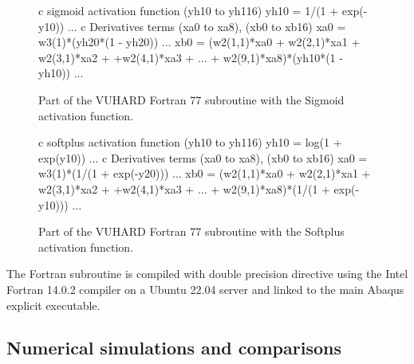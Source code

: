 \documentclass[algorithms,article,submit,pdftex,oneauthors]{Definitions/mdpi}
\begin{document}
\begin{figure}[h]
\begin{FortranListing}
c sigmoid activation function (yh10 to yh116)
      yh10 = 1/(1 + exp(-y10))
      ...
c Derivatives terms (xa0 to xa8), (xb0 to xb16)
      xa0 = w3(1)*(yh20*(1 - yh20))
      ...
      xb0 = (w2(1,1)*xa0 + w2(2,1)*xa1 + w2(3,1)*xa2
     + +w2(4,1)*xa3 + ... + w2(9,1)*xa8)*(yh10*(1 - yh10))
      ...
\end{FortranListing}
\caption{Part of the VUHARD Fortran 77 subroutine with the Sigmoid activation function.\label{fig:FortranSigmoid}}
\end{figure}
\begin{figure}[h]
\begin{FortranListing}
c softplus activation function (yh10 to yh116)
      yh10 = log(1 + exp(y10))
      ...
c Derivatives terms (xa0 to xa8), (xb0 to xb16)
      xa0 = w3(1)*(1/(1 + exp(-y20)))
      ...
      xb0 = (w2(1,1)*xa0 + w2(2,1)*xa1 + w2(3,1)*xa2
     + +w2(4,1)*xa3 + ... + w2(9,1)*xa8)*(1/(1 + exp(-y10)))
      ...
\end{FortranListing}
\caption{Part of the VUHARD Fortran 77 subroutine with the Softplus activation function.\label{fig:FortranSoftplus}}
\end{figure}


The Fortran subroutine is compiled with double precision directive using the Intel Fortran 14.0.2 compiler on a Ubuntu 22.04 server and linked to the main Abaqus explicit executable.

\subsection{Numerical simulations and comparisons}\label{subsec:Num-sim}
\end{document}
